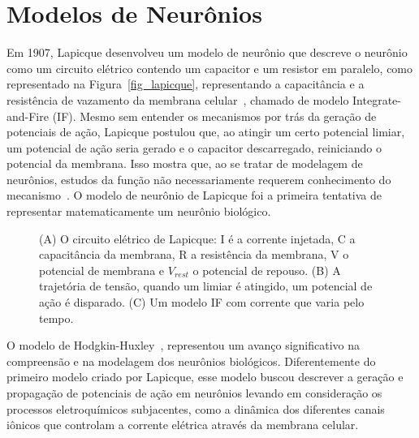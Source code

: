 \section{Modelos de Neurônios}\label{section_modelos_neuronios} 

Em 1907, Lapicque desenvolveu um modelo de neurônio que descreve o neurônio como um circuito elétrico contendo um capacitor e um
resistor em paralelo, como representado na Figura~\ref{fig_lapicque}, representando a capacitância e a resistência de vazamento da
membrana celular~\cite{lapicqueRecherches1907}, chamado de modelo Integrate-and-Fire (IF). Mesmo sem entender os mecanismos por
trás da geração de potenciais de ação, Lapicque postulou que, ao atingir um certo potencial limiar, um potencial de ação seria
gerado e o capacitor descarregado, reiniciando o potencial da membrana. Isso mostra que, ao se tratar de modelagem de neurônios,
estudos da função não necessariamente requerem conhecimento do mecanismo~\cite{abbottLapicque1999}. O modelo de neurônio de
Lapicque foi a primeira tentativa de representar matematicamente um neurônio biológico.

\begin{figure}[!ht]
\caption{(A) O circuito elétrico de Lapicque: I é a corrente injetada, C a capacitância da membrana, R a resistência da membrana,
V o potencial de membrana e $V_{rest}$ o potencial de repouso. (B) A trajetória de tensão, quando um limiar é atingido, um
potencial de ação é disparado. (C) Um modelo IF com corrente que varia pelo tempo.}
\end{figure}

O modelo de Hodgkin-Huxley~\cite{hodgkinQuantitative1952}, representou um a\-van\-ço significativo na compreensão e na modelagem dos
neurônios biológicos. Diferentemente do primeiro modelo criado por Lapicque, esse modelo buscou descrever a geração e propagação
de potenciais de ação em neurônios levando em consideração os processos eletroquímicos subjacentes, como a dinâmica dos diferentes
canais iônicos que controlam a corrente elétrica através da membrana celular.

